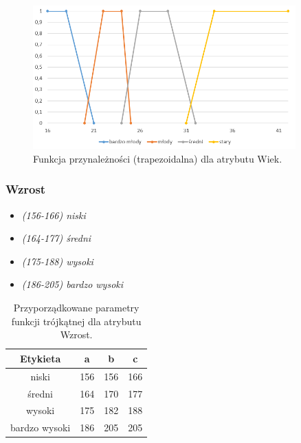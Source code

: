 \documentclass{classrep}
\begin{document}
	\begin{figure}[h!]
		\centering
		\includegraphics[width=0.9\textwidth]{zmienne/1.png}
		\caption{Funkcja przynależności (trapezoidalna) dla atrybutu Wiek.}
		\label{wykresWiek}
	\end{figure}
	
	\newpage
	\subsubsection{Wzrost}
	\begin{itemize}
		\item \textsl{(156-166) niski}
		\item \textsl{(164-177) średni}
		\item \textsl{(175-188) wysoki}
		\item \textsl{(186-205) bardzo wysoki}
	\end{itemize}
	
	\begin{table}[h!]
		\centering
		\begin{tabular} {c c c c}
			\hline
			\textbf{Etykieta} & \textbf{a} & \textbf{b} & \textbf{c} \\ [0.5ex] 
			\hline	
			\hline 
			niski & 156 & 156 & 166 \\
			średni & 164 & 170 & 177 \\
			wysoki & 175 & 182 & 188 \\
			bardzo wysoki & 186 & 205 & 205  \\
			\hline
		\end{tabular}
		\caption{Przyporządkowane parametry funkcji trójkątnej dla atrybutu Wzrost. }
		\label{tabelaWzrost}
	\end{table}
	
\end{document}
